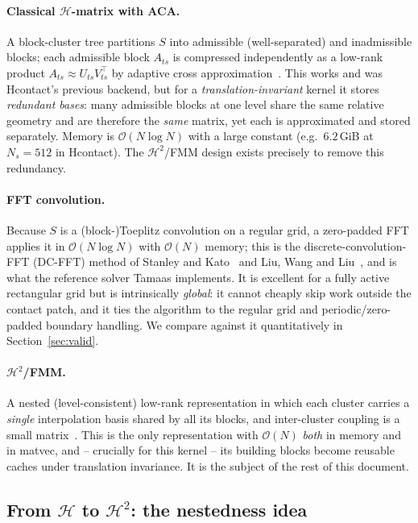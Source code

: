 \documentclass[11pt,a4paper]{article}
\newcommand{\Order}{\mathcal{O}}
\newcommand{\Htwo}{\mathcal{H}^2}
\newcommand{\Hmat}{\mathcal{H}}
\theoremstyle{definition}
\theoremstyle{remark}
\begin{document}
\paragraph{Classical $\Hmat$-matrix with ACA.} A block-cluster tree partitions
$S$ into admissible (well-separated) and inadmissible blocks; each admissible
block $A_{ts}$ is compressed independently as a low-rank product
$A_{ts}\approx U_{ts}V_{ts}^\top$ by adaptive cross
approximation~\cite{Bebendorf2008,Hackbusch2015}. This works and was Hcontact's
previous backend, but for a \emph{translation-invariant} kernel it stores
\emph{redundant bases}: many admissible blocks at one level share the same
relative geometry and are therefore the \emph{same} matrix, yet each is
approximated and stored separately. Memory is $\Order(N\log N)$ with a large
constant (e.g.\ $6.2$\,GiB at $N_s=512$ in Hcontact). The $\Htwo$/FMM design
exists precisely to remove this redundancy.

\paragraph{FFT convolution.} Because $S$ is a (block-)Toeplitz convolution on a
regular grid, a zero-padded FFT applies it in $\Order(N\log N)$ with $\Order(N)$
memory; this is the discrete-convolution-FFT (DC-FFT) method of Stanley and
Kato~\cite{StanleyKato1997} and Liu, Wang and Liu~\cite{LiuWangLiu2000}, and is
what the reference solver Tamaas implements. It is excellent for a fully active
rectangular grid but is intrinsically \emph{global}: it cannot cheaply skip work
outside the contact patch, and it ties the algorithm to the regular grid and
periodic/zero-padded boundary handling. We compare against it quantitatively in
Section~\ref{sec:valid}.

\paragraph{$\Htwo$/FMM.} A nested (level-consistent) low-rank representation in
which each cluster carries a \emph{single} interpolation basis shared by all its
blocks, and inter-cluster coupling is a small matrix~\cite{FongDarve2009,Hackbusch2015,BoerHugesAnda2006}.
This is the only representation with $\Order(N)$ \emph{both} in memory and in
matvec, and -- crucially for this kernel -- its building blocks become reusable
caches under translation invariance. It is the subject of the rest of this
document.

\subsection{From $\Hmat$ to $\Htwo$: the nestedness idea}
\end{document}
